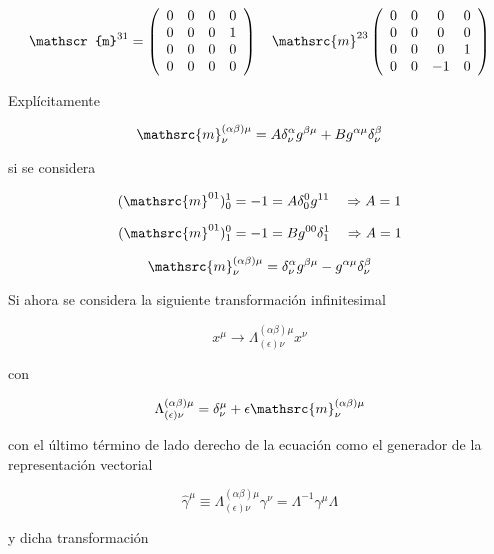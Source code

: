 \documentclass{report}
\begin{document}
\[\mathscr{m}^{31} = \left ( \begin{array}{cccc}
 0 & 0 & 0 & 0 \\
0 & 0 & 0 & 1 \\
0 & 0 & 0 &0 \\
0 & 0 & 0 &0 \\ \end{array} \right) \quad \mathsrc{m}^{23} \left ( \begin{array}{cccc}
 0 & 0 & 0 & 0 \\
 0 & 0 & 0 &0 \\
 0 & 0 & 0 &1 \\
0 & 0 & -1 &0 \\ \end{array} \right)
\]

Explícitamente

\begin{equation}
\mathsrc{m}^{(\alpha \beta)\mu}_{\nu} = A \delta^{\alpha}_{\nu} g^{\beta \mu} + B g^{\alpha \mu} \delta^{\beta}_{\nu}
\end{equation}

si se considera

\[(\mathsrc{m}^{01})^{1}_{0} = -1 = A \delta_{0}^{0} g^{11} \quad \Rightarrow A = 1\]

\[(\mathsrc{m}^{01})^{0}_{1} = -1 = B g^{00} \delta_{1}^{1} \quad \Rightarrow A = 1\]

\begin{equation}
\mathsrc{m}^{(\alpha \beta) \mu}_{\nu} = \delta_{\nu}^{\alpha} g^{\beta \mu} - g^{\alpha \mu} \delta_{\nu}^{\beta}
\end{equation}

Si ahora se considera la siguiente transformación infinitesimal

\[x^{\mu} \rightarrow \Lambda_{(\epsilon)\nu}^{(\alpha \beta)\mu} x^{\nu} \]

con

\begin{equation}
\Lambda_{(\epsilon)\nu}^{(\alpha \beta)\mu} = \delta_{\nu}^{\mu} + \epsilon \mathsrc{m}^{(\alpha \beta)\mu}_{\nu}
\end{equation}

con el último término de lado derecho de la ecuación como el generador de la representación vectorial

\[\hat{\gamma}^{\mu} \equiv \Lambda_{(\epsilon)\nu}^{(\alpha \beta)\mu} \gamma^{\nu} = \Lambda^{-1} \gamma^{\mu} \Lambda\]

y dicha transformación
\end{document}
